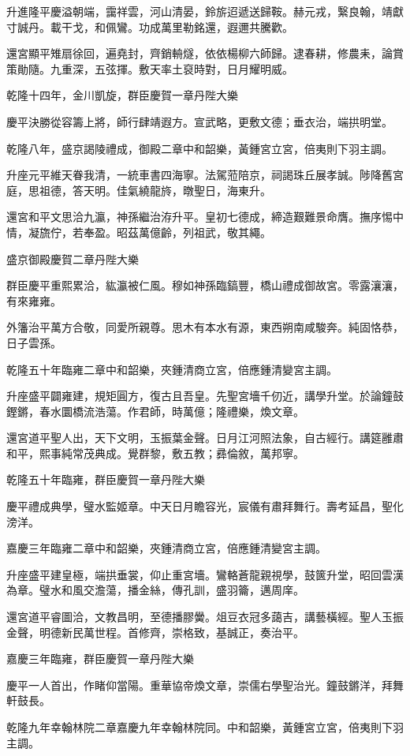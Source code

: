 \begin{pinyinscope}
升進隆平慶溢朝端，靄祥雲，河山清晏，鈴旂迢遞送歸鞍。赫元戎，繄良翰，靖獻寸誠丹。載干戈，和佩鸞。功成萬里勒銘還，遐邇共騰歡。

還宮顯平雉扇徐回，遍堯封，齊銷輈燧，依依楊柳六師歸。逮春耕，修農耒，論賞策勛隨。九重深，五弦揮。敷天率土裒時對，日月耀明威。

乾隆十四年，金川凱旋，群臣慶賀一章丹陛大樂

慶平決勝從容籌上將，師行肆靖遐方。宣武略，更敷文德；垂衣治，端拱明堂。

乾隆八年，盛京謁陵禮成，御殿二章中和韶樂，黃鍾宮立宮，倍夷則下羽主調。

升座元平維天眷我清，一統車書四海寧。法駕蒞陪京，祠謁珠丘展孝誠。陟降舊宮庭，思祖德，答天明。佳氣繞龍旍，暾聖日，海東升。

還宮和平文思洽九瀛，神孫繼治洊升平。皇初七德成，締造艱難景命膺。撫序惕中情，凝旒佇，若奉盈。昭茲萬億齡，列祖武，敬其繩。

盛京御殿慶賀二章丹陛大樂

群臣慶平重熙累洽，紘瀛被仁風。穆如神孫臨鎬豐，橋山禮成御故宮。零露瀼瀼，有來雍雍。

外籓治平萬方合敬，同愛所親尊。思木有本水有源，東西朔南咸駿奔。純固恪恭，日子雲孫。

乾隆五十年臨雍二章中和韶樂，夾鍾清商立宮，倍應鍾清變宮主調。

升座盛平闢雍建，規矩圓方，復古且吾皇。先聖宮墻千仞近，講學升堂。於論鐘鼓鏗鏘，春水圜橋流浩蕩。作君師，時萬億；隆禮樂，煥文章。

還宮道平聖人出，天下文明，玉振葉金聲。日月江河照法象，自古經行。講筵雝肅和平，熙事純常茂典成。覺群黎，敷五教；彞倫敘，萬邦寧。

乾隆五十年臨雍，群臣慶賀一章丹陛大樂

慶平禮成典學，璧水監姬章。中天日月瞻容光，宸儀有肅拜舞行。壽考延昌，聖化滂洋。

嘉慶三年臨雍二章中和韶樂，夾鍾清商立宮，倍應鍾清變宮主調。

升座盛平建皇極，端拱垂裳，仰止重宮墻。鸞輅蒼龍親視學，鼓篋升堂，昭回雲漢為章。璧水和風交澹蕩，播金絲，傳孔訓，盛羽籥，邁周庠。

還宮道平睿圖洽，文教昌明，至德播膠黌。俎豆衣冠多藹吉，講藝橫經。聖人玉振金聲，明德新民萬世程。首修齊，崇格致，基誠正，奏治平。

嘉慶三年臨雍，群臣慶賀一章丹陛大樂

慶平一人首出，作睹仰當陽。重華協帝煥文章，崇儒右學聖治光。鐘鼓鏘洋，拜舞軒鼓長。

乾隆九年幸翰林院二章嘉慶九年幸翰林院同。中和韶樂，黃鍾宮立宮，倍夷則下羽主調。


\end{pinyinscope}
